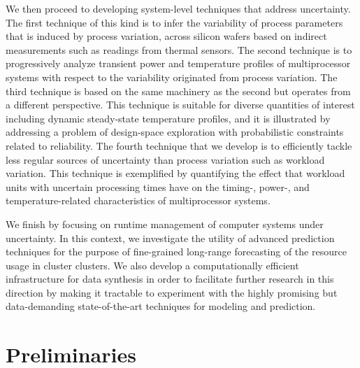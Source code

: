 We then proceed to developing system-level techniques that address uncertainty.
The first technique of this kind is to infer the variability of process
parameters that is induced by process variation, across silicon wafers based on
indirect measurements such as readings from thermal sensors. The second
technique is to progressively analyze transient power and temperature profiles
of multiprocessor systems with respect to the variability originated from
process variation. The third technique is based on the same machinery as the
second but operates from a different perspective. This technique is suitable for
diverse quantities of interest including dynamic steady-state temperature
profiles, and it is illustrated by addressing a problem of design-space
exploration with probabilistic constraints related to reliability. The fourth
technique that we develop is to efficiently tackle less regular sources of
uncertainty than process variation such as workload variation. This technique is
exemplified by quantifying the effect that workload units with uncertain
processing times have on the timing-, power-, and temperature-related
characteristics of multiprocessor systems.

We finish by focusing on runtime management of computer systems under
uncertainty. In this context, we investigate the utility of advanced prediction
techniques for the purpose of fine-grained long-range forecasting of the
resource usage in cluster clusters. We also develop a computationally efficient
infrastructure for data synthesis in order to facilitate further research in
this direction by making it tractable to experiment with the highly promising
but data-demanding state-of-the-art techniques for modeling and prediction.

\section{Preliminaries}
